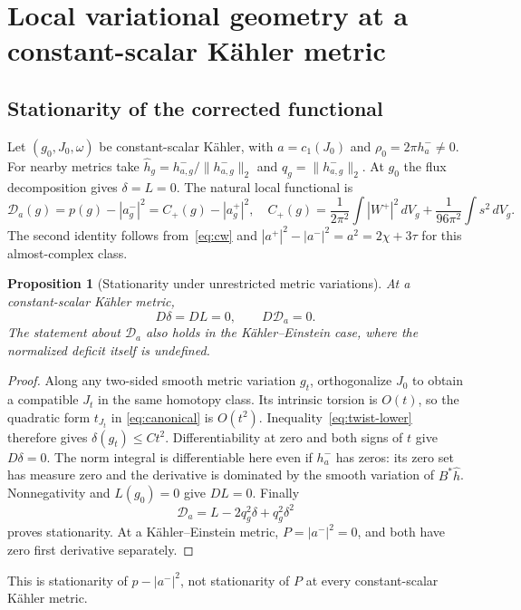 \documentclass[11pt]{article}
\newcommand{\dd}{\,dV_g}
\newtheorem{proposition}[theorem]{Proposition}
\theoremstyle{definition}
\theoremstyle{remark}
\begin{document}
\section{Local variational geometry at a constant-scalar K\"ahler metric}
\label{sec:variation}

\subsection{Stationarity of the corrected functional}

Let $(g_0,J_0,\omega)$ be constant-scalar K\"ahler, with
$a=c_1(J_0)$ and $\rho_0=2\pi h_a^-\ne0$.
For nearby metrics take
$\widehat h_g=h_{a,g}^-/\|h_{a,g}^-\|_2$ and
$q_g=\|h_{a,g}^-\|_2$. At $g_0$ the flux decomposition gives
$\delta=L=0$. The natural local functional is
\begin{equation}
 \mathscr D_a(g)=p(g)-|a_g^-|^2
 =C_+(g)-|a_g^+|^2,
 \quad
 C_+(g)=\frac1{2\pi^2}\int|W^+|^2\dd+
                 \frac1{96\pi^2}\int s^2\dd.
 \label{eq:corrected-functional}
\end{equation}
The second identity follows from~\eqref{eq:cw} and
$|a^+|^2-|a^-|^2=a^2=2\chi+3\tau$ for this almost-complex class.

\begin{proposition}[Stationarity under unrestricted metric variations]
\label{prop:stationarity}
At a constant-scalar K\"ahler metric,
\begin{equation}
 D\delta=DL=0,\qquad D\mathscr D_a=0.
 \label{eq:stationarity}
\end{equation}
The statement about $\mathscr D_a$ also holds in the K\"ahler--Einstein
case, where the normalized deficit itself is undefined.
\end{proposition}
\begin{proof}
Along any two-sided smooth metric variation $g_t$, orthogonalize $J_0$
to obtain a compatible $J_t$ in the same homotopy class. Its intrinsic
torsion is $O(t)$, so the quadratic form $t_{J_t}$ in
\eqref{eq:canonical} is $O(t^2)$. Inequality~\eqref{eq:twist-lower}
therefore gives $\delta(g_t)\le C t^2$.
Differentiability at zero and both signs of $t$ give $D\delta=0$.
The norm integral is differentiable here even if $h_a^-$ has zeros:
its zero set has measure zero and the derivative is dominated by the
smooth variation of $B^*\widehat h$.
Nonnegativity and $L(g_0)=0$ give $DL=0$.
Finally
\[
 \mathscr D_a=L-2q_g^2\delta+q_g^2\delta^2
\]
proves stationarity. At a K\"ahler--Einstein metric,
$P=|a^-|^2=0$, and both have zero first derivative separately.
\end{proof}
This is stationarity of $p-|a^-|^2$, not stationarity of $P$ at every
constant-scalar K\"ahler metric.
\end{document}
